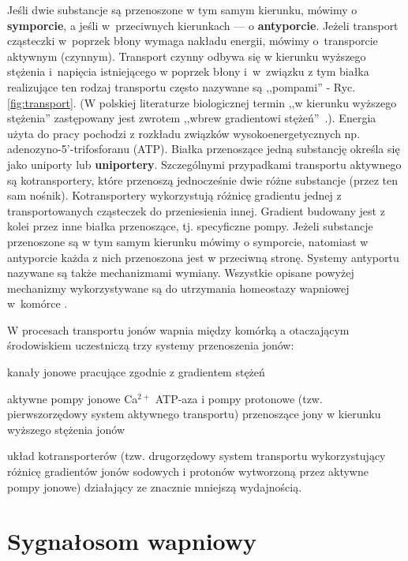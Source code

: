 Jeśli dwie substancje są przenoszone w tym samym kierunku, mówimy o \textbf{symporcie}, a jeśli w~przeciwnych kierunkach — o \textbf{antyporcie}. Jeżeli transport cząsteczki w~poprzek błony wymaga nakładu energii, mówimy o~transporcie aktywnym (czynnym). Transport czynny odbywa się w kierunku wyższego stężenia i~napięcia istniejącego w poprzek błony i~w~związku z tym białka realizujące ten rodzaj transportu często nazywane są ,,pompami'' - Ryc. \ref{fig:transport}. (W polskiej literaturze biologicznej termin ,,w kierunku wyższego stężenia'' zastępowany jest zwrotem ,,wbrew gradientowi stężeń''~\cite{Traczyk2007}.). Energia użyta do pracy pochodzi z rozkładu związków wysokoenergetycznych np. adenozyno-5'-trifosforanu (ATP). Białka przenoszące jedną substancję określa się jako uniporty lub \textbf{uniportery}. Szczególnymi przypadkami transportu aktywnego są kotransportery, które przenoszą jednocześnie dwie różne substancje (przez ten sam nośnik). Kotransportery wykorzystują różnicę gradientu jednej z transportowanych cząsteczek do przeniesienia innej. Gradient budowany jest z kolei przez inne białka przenoszące, tj. specyficzne pompy. Jeżeli substancje przenoszone są w tym samym kierunku mówimy o symporcie, natomiast w antyporcie każda z nich przenoszona jest w przeciwną stronę. Systemy antyportu nazywane są także mechanizmami wymiany. Wszystkie opisane powyżej mechanizmy wykorzystywane są do utrzymania homeostazy wapniowej w~komórce \cite{Traczyk2007}.

W procesach transportu jonów wapnia między komórką a otaczającym środowiskiem uczestniczą trzy systemy przenoszenia jonów:

\begin{bulletList}
\item kanały jonowe pracujące zgodnie z gradientem stężeń
\item aktywne pompy jonowe Ca$^{2+}$ ATP-aza i pompy protonowe (tzw. pierwszorzędowy system aktywnego transportu) przenoszące jony w kierunku wyższego stężenia jonów
\item układ kotransporterów (tzw. drugorzędowy system transportu wykorzystujący różnicę gradientów jonów sodowych i protonów wytworzoną przez aktywne pompy jonowe) działający ze znacznie mniejszą wydajnością.
\end{bulletList}


\section{Sygnałosom wapniowy}

